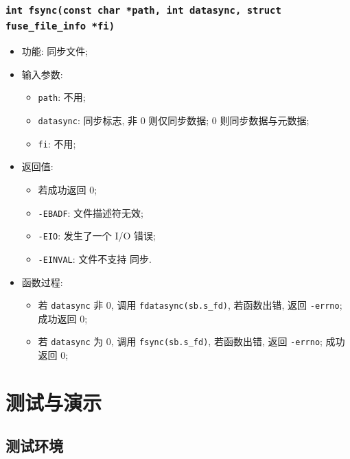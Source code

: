 \documentclass[nofonts]{ctexart}
\begin{document}
  \subsubsection[\texttt{fsync}]{\texttt{int fsync(const char *path, int datasync, struct fuse\_file\_info *fi)}}

  \begin{itemize}
\item
  功能: 同步文件;
\item
  输入参数:

  \begin{itemize}
  \item
    \texttt{path}: 不用;
  \item
    \texttt{datasync}: 同步标志, 非 0 则仅同步数据; 0
    则同步数据与元数据;
  \item
    \texttt{fi}: 不用;
  \end{itemize}
\item
  返回值:

  \begin{itemize}
  \item
    若成功返回 0;
  \item
    \texttt{-EBADF}: 文件描述符无效;
  \item
    \texttt{-EIO}: 发生了一个 I/O 错误;
  \item
    \texttt{-EINVAL}: 文件不支持 同步.
  \end{itemize}
\item
  函数过程:

  \begin{itemize}
  \item
    若 \texttt{datasync} 非 0, 调用 \texttt{fdatasync(sb.s\_fd)},
    若函数出错, 返回 \texttt{-errno}; 成功返回 0;
  \item
    若 \texttt{datasync} 为 0, 调用 \texttt{fsync(sb.s\_fd)},
    若函数出错, 返回 \texttt{-errno}; 成功返回 0;
  \end{itemize}
\end{itemize}

\section{测试与演示}\label{ux6d4bux8bd5ux4e0eux6f14ux793a}

\subsection{测试环境}\label{ux6d4bux8bd5ux73afux5883}
\end{document}
